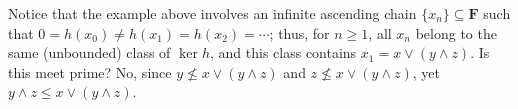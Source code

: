 Notice that the example above involves an infinite ascending chain $\{x_n\} \subseteq \mathbf F$
such that $0 = h(x_0) \neq h(x_1) = h(x_2) = \cdots$; thus, for $n\geq 1$, all $x_n$ belong to the same 
(unbounded) class of $\ker h$, and this class contains $x_1 = x \vee (y \wedge z)$.
Is this meet prime?  No, since $y \nleq x \vee (y \wedge z)$ and $z \nleq x \vee (y \wedge z)$, yet 
$y \wedge z \leq x \vee (y \wedge z)$.
% 
% 
% 





\newpage



  \appendix


